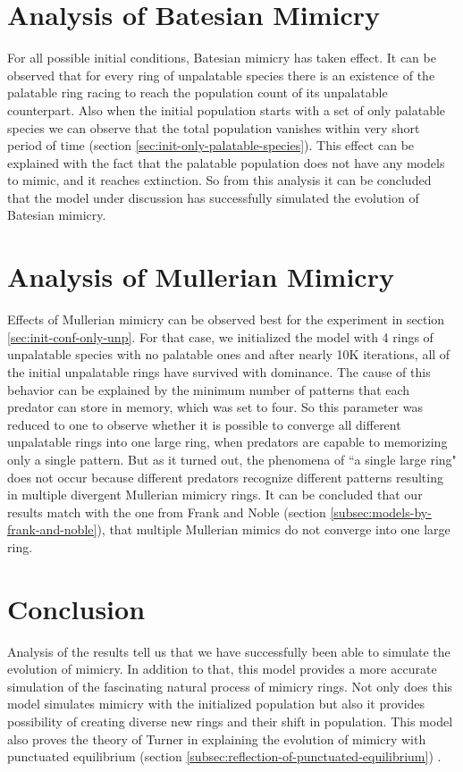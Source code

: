 \section{Analysis of Batesian Mimicry}
\label{sec:result-batesian-mimicry}
For all possible initial conditions, Batesian mimicry has taken effect. It can be observed that for every ring of unpalatable species there is an existence of the palatable ring racing to reach the population count of its unpalatable counterpart. Also when the initial population starts with a set of only palatable species we can observe that the total population vanishes within very short period of time (section \ref{sec:init-only-palatable-species}). This effect can be explained with the fact that the palatable population does not have any models to mimic, and it reaches extinction. So from this analysis it can be concluded that the model under discussion has successfully simulated the evolution of Batesian mimicry.

\section{Analysis of Mullerian Mimicry}
\label{sec:result-mullerian-mimicry}
Effects of Mullerian mimicry can be observed best for the experiment in section \ref{sec:init-conf-only-unp}. For that case, we initialized the model with 4 rings of unpalatable species with no palatable ones and after nearly 10K iterations, all of the initial unpalatable rings have survived with dominance. The cause of this behavior can be explained by the minimum number of patterns that each predator can store in memory, which was set to four. So this parameter was reduced to one to observe whether it is possible to converge all different unpalatable rings into one large ring, when predators are capable to memorizing only a single pattern. But as it turned out, the phenomena of ``a single large ring" does not occur because different predators recognize different patterns resulting in multiple divergent Mullerian mimicry rings. It can be concluded that our results match with the one from Frank and Noble (section \ref{subsec:models-by-frank-and-noble}), that multiple Mullerian mimics do not converge into one large ring.

\section{Conclusion}
\label{sec:result-conclusion}
Analysis of the results tell us that we have successfully been able to simulate the evolution of mimicry. In addition to that, this model provides a more accurate simulation of the fascinating natural process of mimicry rings. Not only does this model simulates mimicry with the initialized population but also it provides possibility of creating diverse new rings and their shift in population. This model also proves the theory of Turner in explaining the evolution of mimicry with punctuated equilibrium (section \ref{subsec:reflection-of-punctuated-equilibrium}) \cite{turner1988}.